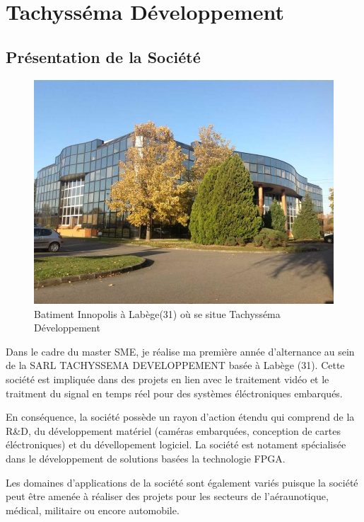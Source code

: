 \section{Tachysséma Développement}
\subsection{Présentation de la Société}

\begin{figure}[ht]
    \centering
    \includegraphics[scale=0.3]{img/bureau.jpg}
    \caption{Batiment Innopolis à Labège(31) où se situe Tachysséma Développement }
    \label{fig:CameraCmdsettings}
\end{figure}



Dans le cadre du master SME, je réalise ma première année d'alternance au sein de la SARL TACHYSSEMA DEVELOPPEMENT basée à Labège (31).
Cette société est impliquée dans des projets en lien avec le traitement vidéo et le traitment du signal en temps réel pour des systèmes éléctroniques embarqués. 

En conséquence, la société possède un rayon d'action étendu qui comprend de la R\&D, du développement matériel (caméras embarquées, conception de cartes éléctroniques) et du dévellopement logiciel. La société est notament spécialisée dans le développement de solutions basées la technologie FPGA.  

Les domaines d'applications de la société sont également variés puisque la société peut être amenée à réaliser des projets pour les secteurs de l'aéraunotique, médical, militaire ou encore automobile. 



